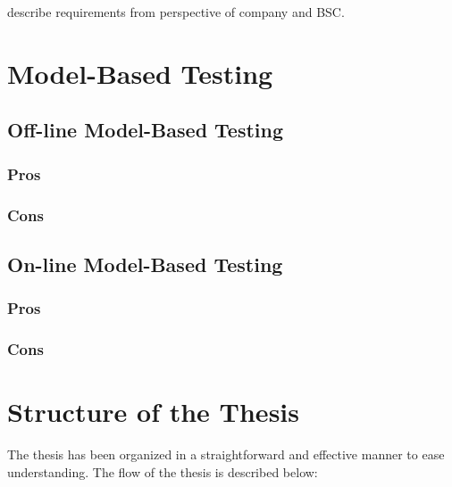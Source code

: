 describe requirements from perspective of company and BSC.

\section{Model-Based Testing}
\subsection{Off-line Model-Based Testing}
\subsubsection{Pros}
\subsubsection{Cons}
\subsection{On-line Model-Based Testing}
\subsubsection{Pros}
\subsubsection{Cons}

\section{Structure of the Thesis}
The thesis has been organized in a straightforward and effective manner to ease understanding. The flow of the thesis is described below:

